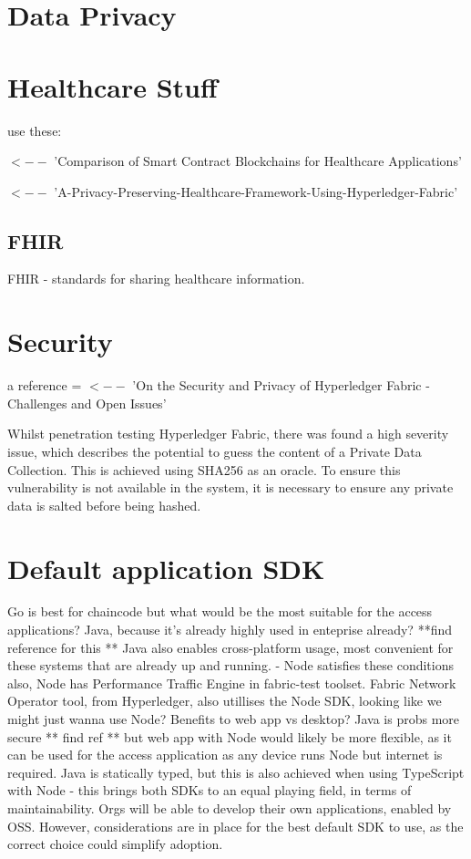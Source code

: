 \documentclass{report}
\begin{document}
\begin{flushleft}
\section{Data Privacy}

\section{Healthcare Stuff} %

use these: 

\cite{yu_comparison_2020} $<--$ 'Comparison of Smart Contract Blockchains for Healthcare Applications'

\cite{stamatellis_privacy-preserving_2020} $<--$ 'A-Privacy-Preserving-Healthcare-Framework-Using-Hyperledger-Fabric'

\subsection{FHIR}
FHIR - standards for sharing healthcare information.\linebreak[1]

\section{Security}

a reference = \cite{brotsis_security_2020} $<--$ 'On the Security and Privacy of Hyperledger Fabric - Challenges and Open Issues'

Whilst penetration testing Hyperledger Fabric, there was found a high severity issue, which describes the potential to guess the content of a Private Data Collection.
This is achieved using SHA256 as an oracle. To ensure this vulnerability is not available in the system, it is necessary to ensure any private data is salted before being hashed. \cite{shaw_penetration_2019}


\section{Default application SDK}
Go is best for chaincode but what would be the most suitable for the access applications? Java, because it's already highly used in enteprise already? **find reference for this ** 
Java also enables cross-platform usage, most convenient for these systems that are already up and running. - Node satisfies these conditions also, Node has Performance Traffic Engine in fabric-test toolset.
Fabric Network Operator tool, from Hyperledger, also utillises the Node SDK, looking like we might just wanna use Node? Benefits to web app vs desktop? 
Java is probs more secure ** find ref ** but web app with Node would likely be more flexible, as it can be used for the access application as any device runs Node but internet is required.
Java is statically typed, but this is also achieved when using TypeScript with Node - this brings both SDKs to an equal playing field, in terms of maintainability.
Orgs will be able to develop their own applications, enabled by OSS. However, considerations are in place for the best default SDK to use, as the correct choice could simplify adoption.


\end{flushleft}
\end{document}
